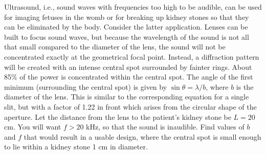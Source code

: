 Ultrasound, i.e., sound waves with frequencies too high
to be audible, can be used for imaging fetuses in the womb
or for breaking up kidney stones so that they can be
eliminated by the body. Consider the latter application.
Lenses can be built to focus sound waves, but because the
wavelength of the sound is not all that small compared to
the diameter of the lens, the sound will not be concentrated
exactly at the geometrical focal point. Instead, a
diffraction pattern will be created with an intense central
spot surrounded by fainter rings. About 85\% of the power
is concentrated within the central spot. The angle of the
first minimum (surrounding the central spot) is given by
$\sin \theta =\lambda/b$, where $b$ is the diameter of the
lens. This is similar to the corresponding equation for a
single slit, but with a factor of 1.22 in front which arises
from the circular shape of the aperture. Let the distance
from the lens to the patient's kidney stone be $L=20$ cm.
You will want $f>20$ kHz, so that the sound is inaudible.
Find values of $b$ and $f$ that would result in a usable
design, where the central spot is small enough to lie within
a kidney stone 1 cm in diameter.
